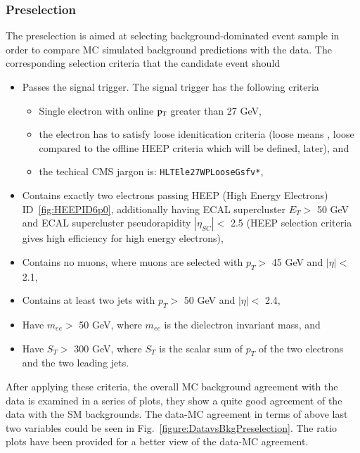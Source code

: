 \subsubsection{Preselection}
\label{subsubsec:eejjPreselection}
The preselection is aimed at selecting background-dominated event sample in order to compare MC simulated background predictions with the data.
The corresponding selection criteria that the candidate event should
\begin{itemize}
  \item Passes the signal trigger. The signal trigger has the following criteria
    \begin{itemize}
     \item Single electron with online $\rm p_{T}$ greater than 27 GeV,
     \item the electron has to satisfy loose idenitication criteria (loose means , loose compared to the offline HEEP criteria which will be defined, later), and 
     \item the techical CMS jargon is: \texttt{HLT\textunderscore Ele27\textunderscore WPLoose\textunderscore Gsf\textunderscore v*},

     \end{itemize}

  \item Contains exactly two electrons passing HEEP (High Energy Electrons) ID~\ref{fig:HEEPID6p0}, additionally having ECAL supercluster ${E_T} >$ 50 GeV and ECAL supercluster pseudorapidity $|\eta_{SC}| <$ 2.5 (HEEP selection criteria gives high efficiency for high energy electrons),
  \item Contains no muons, where muons are selected with $p_T >$ 45 GeV and $|\eta| <$ 2.1,
  \item Contains at least two jets with $p_T >$ 50 GeV and $|\eta| <$ 2.4,
  \item Have $m_{ee} >$ 50 GeV, where $m_{ee}$ is the dielectron invariant mass, and 
  \item Have $S_T >$ 300 GeV, where $S_T$ is the scalar sum of  $p_T$ of the two electrons and the two leading jets.
  
\end{itemize}
After applying these criteria, the overall MC background agreement with the data is examined in a series of plots, they show a quite good agreement of the data with the SM backgrounds. The data-MC agreement in terms of above last two variables could be seen in Fig.~\ref{figure:DatavsBkgPreselection}. The ratio plots have been provided for a better view of the data-MC agreement.


